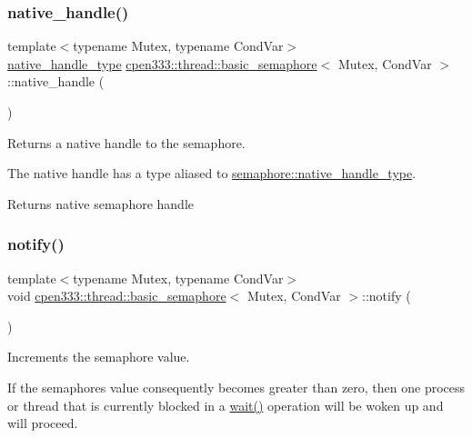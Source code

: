 \subsubsection{\texorpdfstring{native\+\_\+handle()}{native\_handle()}}
{\footnotesize\ttfamily template$<$typename Mutex, typename Cond\+Var$>$ \\
\hyperlink{classcpen333_1_1thread_1_1basic__semaphore_a15d9956adddf81d3a39aea36c6c0fd18}{native\+\_\+handle\+\_\+type} \hyperlink{classcpen333_1_1thread_1_1basic__semaphore}{cpen333\+::thread\+::basic\+\_\+semaphore}$<$ Mutex, Cond\+Var $>$\+::native\+\_\+handle (\begin{DoxyParamCaption}{ }\end{DoxyParamCaption})\hspace{0.3cm}{\ttfamily [inline]}}



Returns a native handle to the semaphore. 

The native handle has a type aliased to \hyperlink{classcpen333_1_1thread_1_1basic__semaphore_a15d9956adddf81d3a39aea36c6c0fd18}{semaphore\+::native\+\_\+handle\+\_\+type}.

\begin{DoxyReturn}{Returns}
native semaphore handle 
\end{DoxyReturn}
\mbox{\label{classcpen333_1_1thread_1_1basic__semaphore_a0b5032fc8df915cb51276411b1153b84}} 
\subsubsection{\texorpdfstring{notify()}{notify()}}
{\footnotesize\ttfamily template$<$typename Mutex, typename Cond\+Var$>$ \\
void \hyperlink{classcpen333_1_1thread_1_1basic__semaphore}{cpen333\+::thread\+::basic\+\_\+semaphore}$<$ Mutex, Cond\+Var $>$\+::notify (\begin{DoxyParamCaption}{ }\end{DoxyParamCaption})\hspace{0.3cm}{\ttfamily [inline]}}



Increments the semaphore value. 

If the semaphore\textquotesingle{}s value consequently becomes greater than zero, then one process or thread that is currently blocked in a \hyperlink{classcpen333_1_1thread_1_1basic__semaphore_ac5cacef970643d393429ff87c0c6d6bf}{wait()} operation will be woken up and will proceed. \mbox{\label{classcpen333_1_1thread_1_1basic__semaphore_a72eb19243d4c55013f7fca9e5aa059f5}} 
